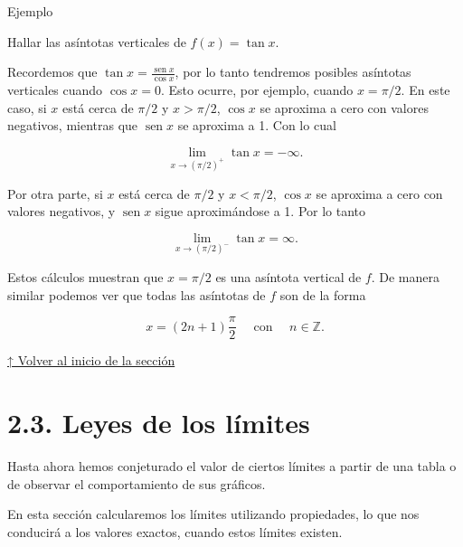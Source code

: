\documentclass[
  letterpaper,
]{book}
\theoremstyle{plain}
\theoremstyle{remark}
\begin{document}
Ejemplo

Hallar las asíntotas verticales de \(f(x)=\tan x\).

\begin{tcolorbox}[enhanced jigsaw, opacityback=0, left=2mm, opacitybacktitle=0.6, toprule=.15mm, bottomrule=.15mm, colbacktitle=quarto-callout-tip-color!10!white, titlerule=0mm, bottomtitle=1mm, title=\textcolor{quarto-callout-tip-color}{\faLightbulb}\hspace{0.5em}{Solución}, toptitle=1mm, colframe=quarto-callout-tip-color-frame, colback=white, breakable, rightrule=.15mm, arc=.35mm, leftrule=.75mm, coltitle=black]

Recordemos que \(\tan x=\frac{\operatorname{sen} x}{\cos x}\), por lo
tanto tendremos posibles asíntotas verticales cuando \(\cos x=0\). Esto
ocurre, por ejemplo, cuando \(x=\pi/2\). En este caso, si \(x\) está
cerca de \(\pi/2\) y \(x>\pi/2\), \(\cos x\) se aproxima a cero con
valores negativos, mientras que \(\operatorname{sen} x\) se aproxima a
1. Con lo cual

\[
\lim_{x\to (\pi/2)^+} \tan x=-\infty.
\]

Por otra parte, si \(x\) está cerca de \(\pi/2\) y \(x<\pi/2\),
\(\cos x\) se aproxima a cero con valores negativos, y
\(\operatorname{sen} x\) sigue aproximándose a 1. Por lo tanto

\[
\lim_{x\to (\pi/2)^-} \tan x=\infty.
\]

Estos cálculos muestran que \(x=\pi/2\) es una asíntota vertical de
\(f\). De manera similar podemos ver que todas las asíntotas de \(f\)
son de la forma

\[
x=\left(2n+1\right)\frac{\pi}{2} \quad \text{ con }\quad n\in\mathbb{Z}.
\]

\end{tcolorbox}

\hyperref[seccion_2.2]{↑ Volver al inicio de la sección}

\section{2.3. Leyes de los límites}\label{seccion_2.3}

Hasta ahora hemos conjeturado el valor de ciertos límites a partir de
una tabla o de observar el comportamiento de sus gráficos.

En esta sección calcularemos los límites utilizando propiedades, lo que
nos conducirá a los valores exactos, cuando estos límites existen.
\end{document}
